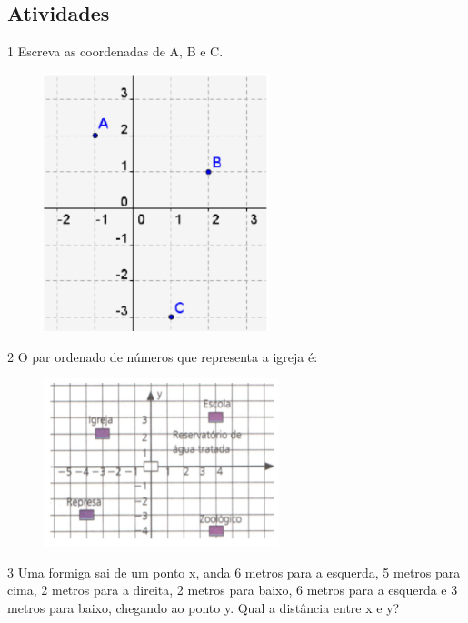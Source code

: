 \begin{escolha}
\begin{escolha}
\section{Atividades}

\num{1} Escreva as coordenadas de A, B e C.

\begin{figure}
\centering
\includegraphics[width=2.58356in,height=2.95026in]{./_SAEB_9_MAT/media/image164.png}
\end{figure}

\begin{boxpeq}
\end{boxpeq}

\num{2} O par ordenado de números que representa a igreja é:

\begin{figure}
\centering
\includegraphics[width=2.7in,height=1.92673in]{./_SAEB_9_MAT/media/image165.png}
\end{figure}

\begin{boxpeq}
\end{boxpeq}

\num{3} Uma formiga sai de um ponto x, anda 6 metros para a esquerda, 5
metros para cima, 2 metros para a direita, 2 metros para baixo, 6 metros
para a esquerda e 3 metros para baixo, chegando ao ponto y. Qual a
distância entre x e y?


\end{escolha}
\end{escolha}

